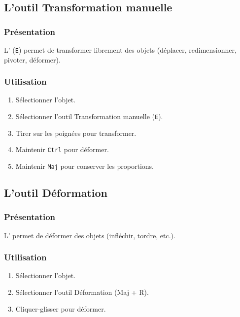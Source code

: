 \subsection{L'outil Transformation manuelle}

\subsubsection{Présentation}

L' (\texttt{E}) permet de transformer librement des objets (déplacer, redimensionner, pivoter, déformer).

\subsubsection{Utilisation}

\begin{enumerate}
    \item Sélectionner l'objet.
    \item Sélectionner l'outil Transformation manuelle (\texttt{E}).
    \item Tirer sur les poignées pour transformer.
    \item Maintenir \texttt{Ctrl} pour déformer.
    \item Maintenir \texttt{Maj} pour conserver les proportions.
\end{enumerate}

\subsection{L'outil Déformation}

\subsubsection{Présentation}

L' permet de déformer des objets (infléchir, tordre, etc.).

\subsubsection{Utilisation}

\begin{enumerate}
    \item Sélectionner l'objet.
    \item Sélectionner l'outil Déformation (Maj + R).
    \item Cliquer-glisser pour déformer.
\end{enumerate}


